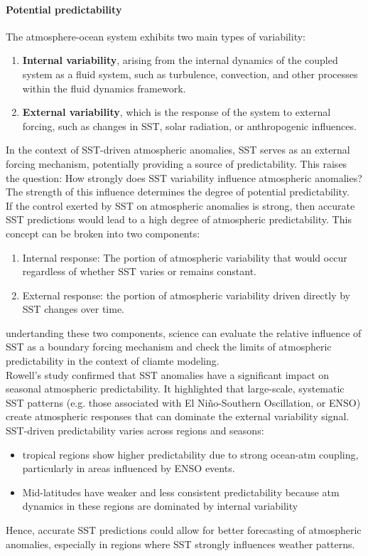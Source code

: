 \paragraph{Potential predictability} The atmosphere-ocean system exhibits two main types of variability:
\begin{enumerate}
	\item \textbf{Internal variability}, arising from the internal dynamics of the coupled system as a fluid system, such as turbulence, convection, and other processes within the fluid dynamics framework.
	\item \textbf{External variability}, which is the response of the system to external forcing, such as changes in SST, solar radiation, or anthropogenic influences.
\end{enumerate}
In the context of SST-driven atmospheric anomalies, SST serves as an external forcing mechanism, potentially providing a source of predictability. This raises the question: How strongly does SST variability influence atmospheric anomalies? The strength of this influence determines the degree of potential predictability.\\

If the control exerted by SST on atmospheric anomalies is strong, then accurate SST predictions would lead to a high degree of atmospheric predictability. This concept can be broken into two components:
\begin{enumerate}
	\item Internal response: The portion of atmospheric variability that would occur regardless of whether SST varies or remains constant.
	\item External response: the portion of atmospheric variability driven directly by SST changes over time.
\end{enumerate}
undertanding these two components, science can evaluate the relative influence of SST as a boundary forcing mechanism and check the limits of atmospheric predictability in the context of cliamte modeling. \\


Rowell's study confirmed that SST anomalies have a significant impact on seasonal atmospheric predictability. It highlighted that large-scale, systematic SST patterns (e.g. those associated with El Niño-Southern Oscillation, or ENSO) create atmospheric responses that can dominate the external variability signal.
SST-driven predictability varies across regions and seasons:
\begin{itemize}
	\item tropical regions show higher predictability due to strong ocean-atm coupling, particularly in areas influenced by ENSO events.
	\item Mid-latitudes have weaker and less consistent predictability because atm dynamics in these regions are dominated by internal variability
\end{itemize}
Hence, accurate SST predictions could allow for better forecasting of atmospheric anomalies, especially in regions where SST strongly influences weather patterns.\\
[0.2cm]


